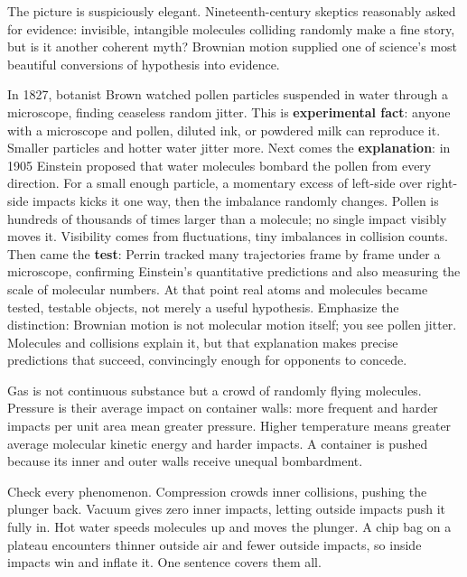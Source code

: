 The picture is suspiciously elegant. Nineteenth-century skeptics reasonably asked for evidence: invisible, intangible molecules colliding randomly make a fine story, but is it another coherent myth? Brownian motion supplied one of science's most beautiful conversions of hypothesis into evidence.

In 1827, botanist Brown watched pollen particles suspended in water through a microscope, finding ceaseless random jitter. This is \textbf{experimental fact}: anyone with a microscope and pollen, diluted ink, or powdered milk can reproduce it. Smaller particles and hotter water jitter more. Next comes the \textbf{explanation}: in 1905 Einstein proposed that water molecules bombard the pollen from every direction. For a small enough particle, a momentary excess of left-side over right-side impacts kicks it one way, then the imbalance randomly changes. Pollen is hundreds of thousands of times larger than a molecule; no single impact visibly moves it. Visibility comes from fluctuations, tiny imbalances in collision counts. Then came the \textbf{test}: Perrin tracked many trajectories frame by frame under a microscope, confirming Einstein's quantitative predictions and also measuring the scale of molecular numbers. At that point real atoms and molecules became tested, testable objects, not merely a useful hypothesis. Emphasize the distinction: Brownian motion is not molecular motion itself; you see pollen jitter. Molecules and collisions explain it, but that explanation makes precise predictions that succeed, convincingly enough for opponents to concede.


\begin{oneline}
Gas is not continuous substance but a crowd of randomly flying molecules. Pressure is their average impact on container walls: more frequent and harder impacts per unit area mean greater pressure. Higher temperature means greater average molecular kinetic energy and harder impacts. A container is pushed because its inner and outer walls receive unequal bombardment.
\end{oneline}

Check every phenomenon. Compression crowds inner collisions, pushing the plunger back. Vacuum gives zero inner impacts, letting outside impacts push it fully in. Hot water speeds molecules up and moves the plunger. A chip bag on a plateau encounters thinner outside air and fewer outside impacts, so inside impacts win and inflate it. One sentence covers them all.

